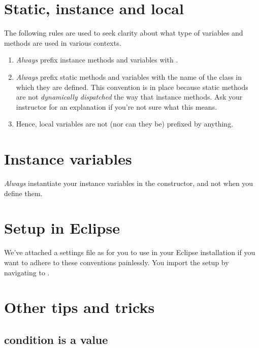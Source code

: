\section{Static, instance and local}

The following rules are used to seek clarity about what type of variables and
methods are used in various contexts.

\begin{enumerate}

\item \emph{Always} prefix instance methods and variables with .

\item \emph{Always} prefix static methods and variables with the name of the
class in which they are defined. This convention is in place because static
methods are not \emph{dynamically dispatched} the way that instance methods.
Ask your instructor for an explanation if you're not sure what this means.

\item Hence, local variables are not (nor can they be) prefixed by anything.

\end{enumerate}

\section{Instance variables}

\emph{Always} instantiate your instance variables in the constructor, and not
when you define them.

\section{Setup in Eclipse}

We've attached a settings file as  for you to use in your
Eclipse installation if you want to adhere to these conventions painlessly. You
import the setup by navigating to .

\section{Other tips and tricks}

\subsection{ condition is a  value}

